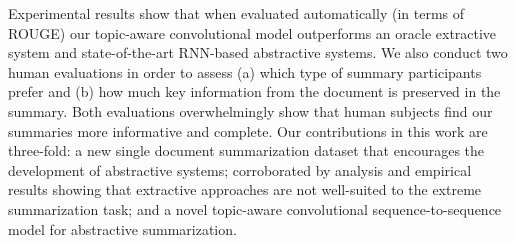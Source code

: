 %





Experimental results show that when evaluated automatically (in terms
of ROUGE) our topic-aware convolutional model outperforms an oracle
extractive system and state-of-the-art RNN-based abstractive
systems. We also conduct two human evaluations in order to assess (a)
which type of summary participants prefer and (b) how much key
information from the document is preserved in the summary. Both
evaluations overwhelmingly show that human subjects find our summaries
more informative and complete. Our contributions in this work are
three-fold: a new single document summarization dataset that
encourages the development of abstractive systems; corroborated by
analysis and empirical results showing that extractive approaches are
not well-suited to the extreme summarization task; and a novel
topic-aware convolutional sequence-to-sequence model for abstractive
summarization.




